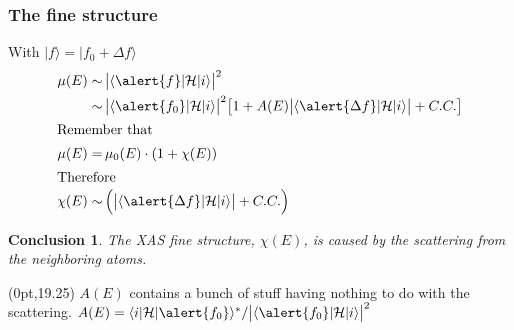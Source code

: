 \documentclass[10pt, xcolor=x11names, compress]{beamer}
\newtheorem{conclusion}[theorem]{Conclusion}
\begin{document}
\begin{frame}
  \frametitle{The fine structure}
  With $|f\rangle = |f_0+\Delta f\rangle$
  \begin{align}
    \mu(E) \sim&\, \big|\langle \alert{f}| \mathcal{H}|i\rangle\big|^2
    \notag\\
    \sim&\, \big|\langle \alert{f_0}| \mathcal{H}|i\rangle\big|^2
    \big[
    1 + A(E)
    \big|\langle \alert{\Delta f}| \mathcal{H}|i\rangle\big|
    + C.C.
    \big]\notag\\
    \intertext{Remember that}
    \mu(E) =&\, \mu_0(E) \cdot (1+\chi(E))\notag\\
    \intertext{Therefore}
    \chi(E) \sim&\,\Big(\big|\langle \alert{\Delta f}|
    \mathcal{H}|i\rangle\big| + C.C.\Big)\notag
  \end{align}

  \begin{conclusion}
    The XAS fine structure, $\chi(E)$, is caused by the scattering from
    the neighboring atoms.
  \end{conclusion}

  \begin{textblock*}{0.6\linewidth}(0pt,19.25\TPVertModule)%
    \tiny%
    $A(E)$ contains a bunch of stuff having nothing to do with the
    scattering. $A(E) = \langle
      i|\mathcal{H}|\alert{f_0}\rangle^\ast / \big|\langle
      \alert{f_0}| \mathcal{H}|i\rangle\big|^2$
  \end{textblock*}
\end{frame}
\end{document}
